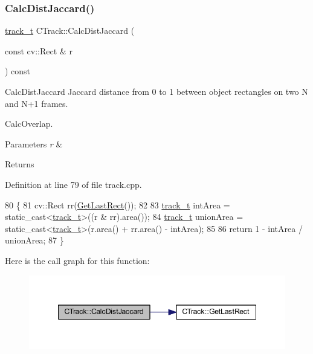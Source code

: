 \subsubsection{\texorpdfstring{Calc\+Dist\+Jaccard()}{CalcDistJaccard()}}
{\footnotesize\ttfamily \mbox{\hyperlink{defines_8h_a7ce9c8817b42ab418e61756f579549ab}{track\+\_\+t}} C\+Track\+::\+Calc\+Dist\+Jaccard (\begin{DoxyParamCaption}\item[{const cv\+::\+Rect \&}]{r }\end{DoxyParamCaption}) const}



Calc\+Dist\+Jaccard Jaccard distance from 0 to 1 between object rectangles on two N and N+1 frames. 

Calc\+Overlap.


\begin{DoxyParams}{Parameters}
{\em r} & \\
\hline
\end{DoxyParams}
\begin{DoxyReturn}{Returns}

\end{DoxyReturn}


Definition at line 79 of file track.\+cpp.


\begin{DoxyCode}
80 \{
81     cv::Rect rr(\mbox{\hyperlink{class_c_track_abe6c22779a5d7f0403980f4b4c647ade}{GetLastRect}}());
82 
83     \mbox{\hyperlink{defines_8h_a7ce9c8817b42ab418e61756f579549ab}{track\_t}} intArea = \textcolor{keyword}{static\_cast<}\mbox{\hyperlink{defines_8h_a7ce9c8817b42ab418e61756f579549ab}{track\_t}}\textcolor{keyword}{>}((r & rr).area());
84     \mbox{\hyperlink{defines_8h_a7ce9c8817b42ab418e61756f579549ab}{track\_t}} unionArea = \textcolor{keyword}{static\_cast<}\mbox{\hyperlink{defines_8h_a7ce9c8817b42ab418e61756f579549ab}{track\_t}}\textcolor{keyword}{>}(r.area() + rr.area() - intArea);
85 
86     \textcolor{keywordflow}{return} 1 - intArea / unionArea;
87 \}
\end{DoxyCode}
Here is the call graph for this function\+:\nopagebreak
\begin{figure}[H]
\begin{center}
\leavevmode
\includegraphics[width=348pt]{class_c_track_a006369684909e91c26d11d0c2753b7ae_cgraph}
\end{center}
\end{figure}
\mbox{\label{class_c_track_ac0482395bf6167103760098b324ca58c}} 

